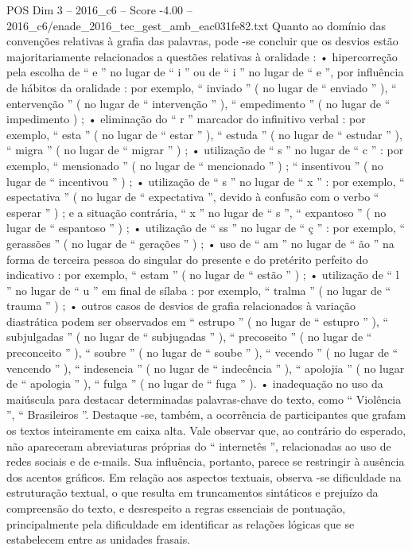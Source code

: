 \begin{textsample}{POS Dim 3 – 2016\_c6 – Score -4.00 – 2016\_c6/enade\_2016\_tec\_gest\_amb\_eac031fe82.txt}
Quanto ao domínio das convenções relativas à grafia das palavras, pode -se concluir que os desvios estão majoritariamente relacionados a questões relativas à oralidade : • hipercorreção pela escolha de “ e ” no lugar de “ i ” ou de “ i ” no lugar de “ e ”, por influência de hábitos da oralidade : por exemplo, “ inviado ” ( no lugar de “ enviado ” ), “ entervenção ” ( no lugar de “ intervenção ” ), “ empedimento ” ( no lugar de “ impedimento ) ; • eliminação do “ r ” marcador do infinitivo verbal : por exemplo, “ esta ” ( no lugar de “ estar ” ), “ estuda ” ( no lugar de “ estudar ” ), “ migra ” ( no lugar de “ migrar ” ) ; • utilização de “ s ” no lugar de “ c ” : por exemplo, “ mensionado ” ( no lugar de “ mencionado ” ) ; “ insentivou ” ( no lugar de “ incentivou ” ) ; • utilização de “ s ” no lugar de “ x ” : por exemplo, “ espectativa ” ( no lugar de “ expectativa ”, devido à confusão com o verbo “ esperar ” ) ; e a situação contrária, “ x ” no lugar de “ s ”, “ expantoso ” ( no lugar de “ espantoso ” ) ; • utilização de “ ss ” no lugar de “ ç ” : por exemplo, “ gerassões ” ( no lugar de “ gerações ” ) ; • uso de “ am ” no lugar de “ ão ” na forma de terceira pessoa do singular do presente e do pretérito perfeito do indicativo : por exemplo, “ estam ” ( no lugar de “ estão ” ) ; • utilização de “ l ” no lugar de “ u ” em final de sílaba : por exemplo, “ tralma ” ( no lugar de “ trauma ” ) ; • outros casos de desvios de grafia relacionados à variação diastrática podem ser observados em “ estrupo ” ( no lugar de “ estupro ” ), “ subjulgadas ” ( no lugar de “ subjugadas ” ), “ precoseito ” ( no lugar de “ preconceito ” ), “ soubre ” ( no lugar de “ soube ” ), “ vecendo ” ( no lugar de “ vencendo ” ), “ indesencia ” ( no lugar de “ indecência ” ), “ apolojia ” ( no lugar de “ apologia ” ), “ fulga ” ( no lugar de “ fuga ” ). • inadequação no uso da maiúscula para destacar determinadas palavras-chave do texto, como “ Violência ”, “ Brasileiros ”.
Destaque -se, também, a ocorrência de participantes que grafam os textos inteiramente em caixa alta.
Vale observar que, ao contrário do esperado, não apareceram abreviaturas próprias do “ internetês ”, relacionadas ao uso de redes sociais e de e-mails.
Sua influência, portanto, parece se restringir à ausência dos acentos gráficos.
Em relação aos aspectos textuais, observa -se dificuldade na estruturação textual, o que resulta em truncamentos sintáticos e prejuízo da compreensão do texto, e desrespeito a regras essenciais de pontuação, principalmente pela dificuldade em identificar as relações lógicas que se estabelecem entre as unidades frasais.

\end{textsample}
